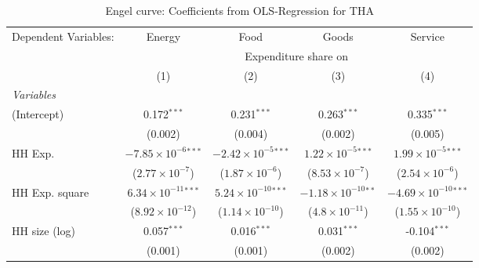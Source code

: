 
\begin{table}[htbp!]
   \centering
   \small
   \begin{adjustbox}{width = 1\textwidth, max height = 0.95\textheight, center}
      \begin{threeparttable}[b]
         \caption{\label{tab:Engel_parametric_THA} Engel curve: Coefficients from OLS-Regression for THA}
         \begin{tabular}{lcccc}
            \tabularnewline \midrule \midrule
            Dependent Variables: & Energy                         & Food                           & Goods                          & Service\\  
             & \multicolumn{4}{c}{Expenditure share on} \\ 
                                 & (1)                            & (2)                            & (3)                            & (4)\\  
            \midrule
            \emph{Variables}\\
            (Intercept)          & 0.172$^{***}$                  & 0.231$^{***}$                  & 0.263$^{***}$                  & 0.335$^{***}$\\   
                                 & (0.002)                        & (0.004)                        & (0.002)                        & (0.005)\\   
            HH Exp.              & $-7.85\times 10^{-6}$$^{***}$  & $-2.42\times 10^{-5}$$^{***}$  & $1.22\times 10^{-5}$$^{***}$   & $1.99\times 10^{-5}$$^{***}$\\    
                                 & ($2.77\times 10^{-7}$)         & ($1.87\times 10^{-6}$)         & ($8.53\times 10^{-7}$)         & ($2.54\times 10^{-6}$)\\    
            HH Exp. square       & $6.34\times 10^{-11}$$^{***}$  & $5.24\times 10^{-10}$$^{***}$  & $-1.18\times 10^{-10}$$^{**}$  & $-4.69\times 10^{-10}$$^{***}$\\    
                                 & ($8.92\times 10^{-12}$)        & ($1.14\times 10^{-10}$)        & ($4.8\times 10^{-11}$)         & ($1.55\times 10^{-10}$)\\    
            HH size (log)        & 0.057$^{***}$                  & 0.016$^{***}$                  & 0.031$^{***}$                  & -0.104$^{***}$\\   
                                 & (0.001)                        & (0.001)                        & (0.002)                        & (0.002)\\   

\end{tabular}
\end{threeparttable}
\end{adjustbox}
\end{table}

